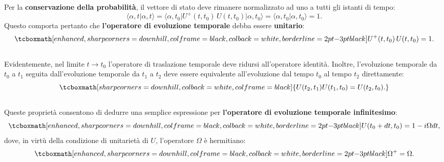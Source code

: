 \documentclass[a4paper,12pt,oneside]{book}
\begin{document}
Per la \textbf{conservazione della probabilità}, il vettore di stato deve rimanere normalizzato ad uno a tutti gli istanti di tempo:
	\begin{equation}
		\langle \alpha, t \vert \alpha, t \rangle =
\langle \alpha, t_0 \vert U^+ (t,t_0)\, U(t,t_0)\vert \alpha, t_0 \rangle =  \langle \alpha, t_0 \vert \alpha, t_0 \rangle =1.
	\end{equation}
Questo comporta pertanto che  \textbf{l'operatore di evoluzione temporale} debba essere \textbf{unitario}:
	\begin{equation}
		\tcboxmath[enhanced, sharp corners=downhill, colframe=black, colback=white, borderline={2pt}{-3pt}{black}]{
			U^+ (t,t_0)\, U(t,t_0)=1.
			}
	\end{equation}\\
	
Evidentemente, nel limite $t\longrightarrow t_0$ l'operatore di traslazione temporale deve ridursi all'operatore identità. Inoltre, l'evoluzione temporale da $t_0$ a $t_1$ seguita dall'evoluzione temporale da $t_1$ a $t_2$ deve essere equivalente all'evoluzione dal tempo $t_0$ al tempo $t_2$ direttamente:
	\begin{equation}
		\tcboxmath[sharp corners=downhill, colback=white, colframe=black]{
			U (t_2,t_1) U(t_1,t_0)=U(t_2,t_0).
			}
	\end{equation}\\
	
Queste proprietà consentono di dedurre una semplice espressione per \textbf{l'operatore di evoluzione temporale infinitesimo}:
	\begin{equation}
		\tcboxmath[enhanced, sharp corners=downhill, colframe=black, colback=white, borderline={2pt}{-3pt}{black}]{
			U(t_0+dt,t_0) = 1-i\Omega dt,
			}
		\label{eq:cap8_1}
	\end{equation}
dove, in virtù della condizione di unitarietà di $U$, l'operatore $\Omega$ è hermitiano:
	\begin{equation}
		\tcboxmath[enhanced, sharp corners=downhill, colframe=black, colback=white, borderline={2pt}{-3pt}{black}]{
			\Omega ^+ = \Omega.
			}
	\end{equation}\\
	
\end{document}
